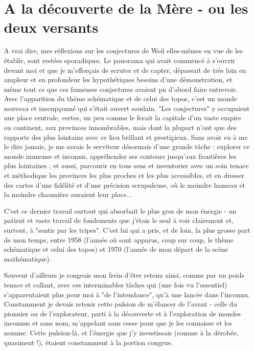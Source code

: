 \section{A la découverte de la Mère - ou les deux versants}

A vrai dire, mes réflexions sur les conjectures de Weil elles-mêmes en vue de les établir, sont restées sporadiques. Le panorama qui avait commencé à s'ouvrir devant moi et que je m'efforçais de scruter et de capter, dépassait de très loin en ampleur et en profondeur les hypothétiques besoins d'une démonstration, et même tout ce que ces fameuses conjectures avaient pu d'abord faire entrevoir. Avec l'apparition du thème schématique et de celui des topos, c'est un monde nouveau et insoupçonné qui s'était ouvert soudain. "Les conjectures" y occupaient une place centrale, certes, un peu comme le ferait la capitale d'un vaste empire ou continent, aux provinces innombrables, mais dont la plupart n'ont que des rapports des plus lointains avec ce lieu brillant et prestigieux. Sans avoir eu à me le dire jamais, je me savais le serviteur désormais d'une grande tâche : explorer ce monde immense et inconnu, appréhender ses contours jusqu'aux frontières les plus lointaines ; et aussi, parcourir en tous sens et inventorier avec un soin tenace et méthodique les provinces les plus proches et les plus accessibles, et en dresser des cartes d'une fidélité et d'une précision scrupuleuse, où le moindre hameau et la moindre chaumière auraient leur place...

C'est ce dernier travail surtout qui absorbait le plus gros de mon énergie - un patient et vaste travail de fondements que j'étais le seul à voir clairement et, surtout, à "sentir par les tripes". C'est lui qui a pris, et de loin, la plus grosse part de mon temps, entre 1958 (l'année où sont apparus, coup sur coup, le thème schématique et celui des topos) et 1970 (l'année de mon départ de la scène mathématique).

Souvent d'ailleurs je rongeais mon frein d'être retenu ainsi, comme par un poids tenace et collant, avec ces interminables tâches qui (une fois vu l'essentiel) s'apparentaient plus pour moi à "de l'intendance", qu'à une lancée dans l'inconnu. Constamment je devais retenir cette pulsion de m'élancer de l'avant - celle  du pionnier ou de l'explorateur, parti à la découverte et à l'exploration de mondes inconnus et sans nom, m'appelant sans cesse pour que je les connaisse et les nomme. Cette pulsion-là, et l'énergie que j'y investissais (comme à la dérobée, quasiment !), étaient constamment à la portion congrue.

